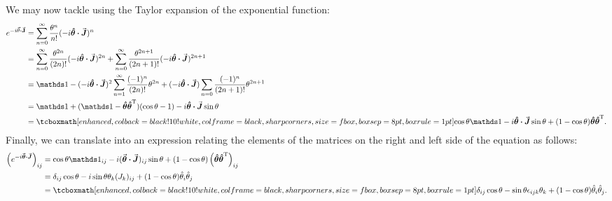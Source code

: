 We may now tackle  using the Taylor expansion of the exponential function:
\begin{align}
    \label{eq:derive-identities}
    e^{-i \va{\theta} \vdot \va{J}} &= \sum_{n=0}^{\infty} \frac{\theta^{n}}{n!}(-i \vu*{\theta} \vdot \va*{J})^{n} \notag \\
    &= \sum_{n=0}^{\infty} \frac{\theta^{2n}}{(2n)!}(-i \vu*{\theta} \vdot \va*{J})^{2n} + \sum_{n=0}^{\infty} \frac{\theta^{2n+1}}{(2n+1)!} (-i\vu*{\theta} \vdot \va*{J})^{2n+1} \notag \\
    &= \id -(-i \vu*{\theta} \vdot \va*{J})^2\sum_{n=1}^{\infty} \frac{(-1)^{n}}{(2n)!} \theta^{2n} + (-i \vu*{\theta} \vdot \va*{J}) \sum_{n=0} \frac{(-1)^{n}}{(2n+1)!} \theta^{2n+1} \notag \\
    &= \id + (\id - \vu*{\theta}\vu*{\theta}^{\rm T})(\cos{\theta} - 1) - i \vu*{\theta} \vdot \va*{J} \sin{\theta} \notag \\
    &= \eqbox{\cos{\theta}\id - i\vu*{\theta} \vdot \va*{J} \sin{\theta} + (1-\cos{\theta})\vu*{\theta}\vu*{\theta}^{\rm T}}
.\end{align}
Finally, we can translate  into an expression relating the elements of the matrices on the right and left side of the equation as follows:
\begin{align}
    \label{eq:derive-element-identity}
    \left( e^{-i \va*{\theta} \vdot \va*{J}} \right)_{ij} &= \cos{\theta} \id_{ij} - i(\va*{\theta} \vdot \va*{J})_{ij}\sin{\theta} + (1-\cos{\theta})\left(\vu*{\theta} \vu*{\theta}^{\rm T}\right)_{ij} \notag \\
                                                          &= \delta_{ij}\cos{\theta} - i\sin{\theta}\theta_{k}(J_{k})_{ij} + (1-\cos{\theta})\hat{\theta}_{i}\hat{\theta}_{j} \notag \\
                                                          &= \eqbox{\delta_{ij}\cos{\theta} - \sin{\theta}\epsilon_{ijk}\theta_{k} + (1-\cos{\theta})\hat{\theta}_{i}\hat{\theta}_{j}}
.\end{align}






